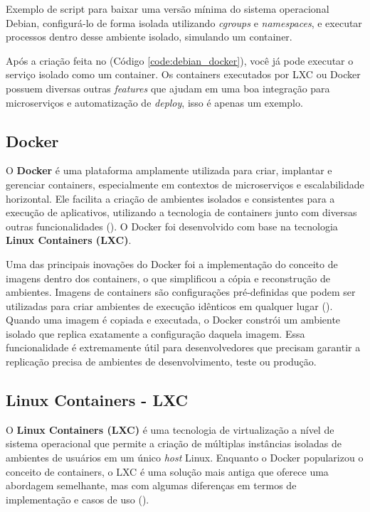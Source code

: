 \begin{listing}[h!]
  \noindent{}  
\caption{Exemplo de script para baixar uma versão mínima do sistema operacional Debian, configurá-lo de forma isolada utilizando \textit{cgroups} e \textit{namespaces}, e executar processos dentro desse ambiente isolado, simulando um container.}
\label{code:debian_docker}
\end{listing}


Após a criação feita no (Código \ref{code:debian_docker}), você já pode executar o serviço isolado como um container. Os containers executados por LXC ou Docker possuem diversas outras \textit{features} que ajudam em uma boa integração para microserviços e automatização de \textit{deploy}, isso é apenas um exemplo.

\subsection{Docker}

O \textbf{Docker} é uma plataforma amplamente utilizada para criar, implantar e gerenciar containers, especialmente em contextos de microserviços e escalabilidade horizontal. Ele facilita a criação de ambientes isolados e consistentes para a execução de aplicativos, utilizando a tecnologia de containers junto com diversas outras funcionalidades (\cite{DockerDocumentation}). O Docker foi desenvolvido com base na tecnologia \textbf{Linux Containers (LXC)}.

Uma das principais inovações do Docker foi a implementação do conceito de imagens dentro dos containers, o que simplificou a cópia e reconstrução de ambientes. Imagens de containers são configurações pré-definidas que podem ser utilizadas para criar ambientes de execução idênticos em qualquer lugar (\cite{DockerDocumentation}). Quando uma imagem é copiada e executada, o Docker constrói um ambiente isolado que replica exatamente a configuração daquela imagem. Essa funcionalidade é extremamente útil para desenvolvedores que precisam garantir a replicação precisa de ambientes de desenvolvimento, teste ou produção.

\subsection{Linux Containers - LXC}  
O \textbf{Linux Containers (LXC)} é uma tecnologia de virtualização a nível de sistema operacional que permite a criação de múltiplas instâncias isoladas de ambientes de usuários em um único \textit{host} Linux. Enquanto o Docker popularizou o conceito de containers, o LXC é uma solução mais antiga que oferece uma abordagem semelhante, mas com algumas diferenças em termos de implementação e casos de uso (\cite{WhatIsDocker}).

